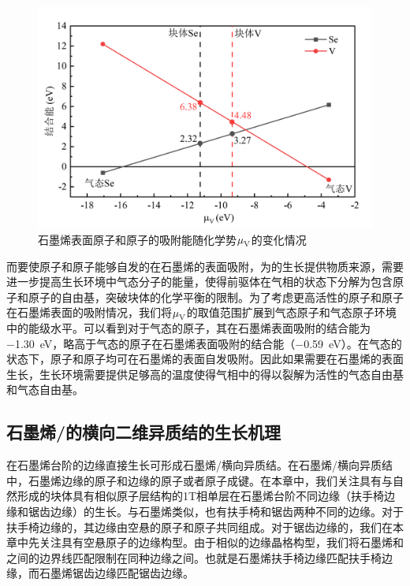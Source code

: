     \begin{figure}[htb]
        \includegraphics{pic/VS_DFT_adatoms.png}
        \caption{石墨烯表面原子和原子的吸附能随化学势$\it \mu_{\rm V}^{\rm } \it$的变化情况}
        \label{fig:VS_DFT_adatoms}
    \end{figure}

    而要使原子和原子能够自发的在石墨烯的表面吸附，为的生长提供物质来源，需要进一步提高生长环境中气态分子的能量，使得前驱体在气相的状态下分解为包含原子和原子的自由基，突破块体的化学平衡的限制。为了考虑更高活性的原子和原子在石墨烯表面的吸附情况，我们将$\it \mu_{\rm V}^{\rm } \it$的取值范围扩展到气态原子和气态原子环境中的能级水平。可以看到对于气态的原子，其在石墨烯表面吸附的结合能为\SI{-1.30}{\electronvolt}，略高于气态的原子在石墨烯表面吸附的结合能（\SI{-0.59}{\electronvolt}）。在气态的状态下，原子和原子均可在石墨烯的表面自发吸附。因此如果需要在石墨烯的表面生长，生长环境需要提供足够高的温度使得气相中的得以裂解为活性的气态自由基和气态自由基。

\subsection{石墨烯/的横向二维异质结的生长机理}
    在石墨烯台阶的边缘直接生长可形成石墨烯/横向异质结。在石墨烯/横向异质结中，石墨烯边缘的原子和边缘的原子或者原子成键。在本章中，我们关注具有与自然形成的块体具有相似原子层结构的1T相单层在石墨烯台阶不同边缘（扶手椅边缘和锯齿边缘）的生长。与石墨烯类似，也有扶手椅和锯齿两种不同的边缘。对于扶手椅边缘的，其边缘由空悬的原子和原子共同组成。对于锯齿边缘的，我们在本章中先关注具有空悬原子的边缘构型。由于相似的边缘晶格构型，我们将石墨烯和之间的边界线匹配限制在同种边缘之间。也就是石墨烯扶手椅边缘匹配扶手椅边缘，而石墨烯锯齿边缘匹配锯齿边缘。

